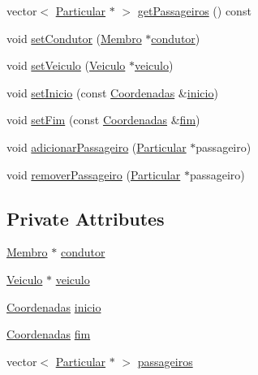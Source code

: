 \begin{DoxyCompactItemize}
\item 
vector$<$ \hyperlink{class_particular}{Particular} $\ast$ $>$ \hyperlink{class_viagem_aaa8ee2324353d9f00c453c24c6a2d92d}{get\+Passageiros} () const 
\item 
void \hyperlink{class_viagem_a2f4fa33d3da68b08681ef35c45bb8e9a}{set\+Condutor} (\hyperlink{class_membro}{Membro} $\ast$\hyperlink{class_viagem_a015bb952a7afce6a348d0a9f88bdaf5c}{condutor})
\item 
void \hyperlink{class_viagem_aa3f5672a7a99fbc78dbf5987fcc05688}{set\+Veiculo} (\hyperlink{class_veiculo}{Veiculo} $\ast$\hyperlink{class_viagem_aee9386a44de6b6afb11faff59331f7b5}{veiculo})
\item 
void \hyperlink{class_viagem_a1123f1c35e2ce003bed4ccfa990ed241}{set\+Inicio} (const \hyperlink{class_coordenadas}{Coordenadas} \&\hyperlink{class_viagem_a0a871b6782ab9b478a530f2c15dc1e32}{inicio})
\item 
void \hyperlink{class_viagem_a6adcbdb92a4470979538f9566f718ff4}{set\+Fim} (const \hyperlink{class_coordenadas}{Coordenadas} \&\hyperlink{class_viagem_ab54e61d41be0157f9e75b14c8e06137f}{fim})
\item 
void \hyperlink{class_viagem_abaf8627f31b45be041716e8bf653968a}{adicionar\+Passageiro} (\hyperlink{class_particular}{Particular} $\ast$passageiro)
\item 
void \hyperlink{class_viagem_a43c491291e4639dc64ac1016ab7f3157}{remover\+Passageiro} (\hyperlink{class_particular}{Particular} $\ast$passageiro)
\end{DoxyCompactItemize}
\subsection*{Private Attributes}
\begin{DoxyCompactItemize}
\item 
\hyperlink{class_membro}{Membro} $\ast$ \hyperlink{class_viagem_a015bb952a7afce6a348d0a9f88bdaf5c}{condutor}
\item 
\hyperlink{class_veiculo}{Veiculo} $\ast$ \hyperlink{class_viagem_aee9386a44de6b6afb11faff59331f7b5}{veiculo}
\item 
\hyperlink{class_coordenadas}{Coordenadas} \hyperlink{class_viagem_a0a871b6782ab9b478a530f2c15dc1e32}{inicio}
\item 
\hyperlink{class_coordenadas}{Coordenadas} \hyperlink{class_viagem_ab54e61d41be0157f9e75b14c8e06137f}{fim}
\item 
vector$<$ \hyperlink{class_particular}{Particular} $\ast$ $>$ \hyperlink{class_viagem_a8417361a46610f9fbbd6a7c43b02c149}{passageiros}
\end{DoxyCompactItemize}



